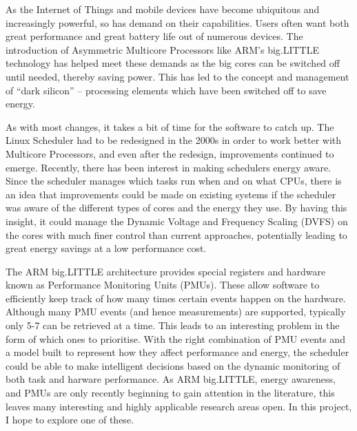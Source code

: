 As the Internet of Things and mobile devices have become ubiquitous and 
increasingly powerful, so has demand on their capabilities. Users often want 
both great performance and great battery life out of numerous devices. The 
introduction of Asymmetric Multicore Processors like ARM's big.LITTLE 
technology has helped meet these demands as the big cores can be switched off 
until needed, thereby saving power. This has led to the concept and management  
of ``dark silicon'' -- processing elements which have been switched off to save 
energy.

As with most changes, it takes a bit of time for the software to catch up. The 
Linux Scheduler had to be redesigned in the 2000s in order to work better with 
Multicore Processors, and even after the redesign, improvements continued to 
emerge. Recently, there has been interest in making schedulers energy aware. 
Since the scheduler manages which tasks run when and on what CPUs, there is an 
idea that improvements could be made on existing systems if the scheduler was 
aware of the different types of cores and the energy they use. By having this 
insight, it could manage the Dynamic Voltage and Frequency Scaling (DVFS) on 
the cores with much finer control than current approaches, potentially leading 
to great energy savings at a low performance cost.

The ARM big.LITTLE architecture provides special registers and hardware known 
as Performance Monitoring Units (PMUs). These allow software to efficiently 
keep track of how many times certain events happen on the hardware. Although 
many PMU events (and hence measurements) are supported, typically only 5-7 can 
be retrieved at a time. This leads to an interesting problem in the form of 
which ones to prioritise. With the right combination of PMU events and a model 
built to represent how they affect performance and energy, the scheduler could 
be able to make intelligent decisions based on the dynamic monitoring of both 
task and harware performance. As ARM big.LITTLE, energy awareness, and PMUs are 
only recently beginning to gain attention in the literature, this leaves many 
interesting and highly applicable research areas open. In this project, I hope 
to explore one of these.
